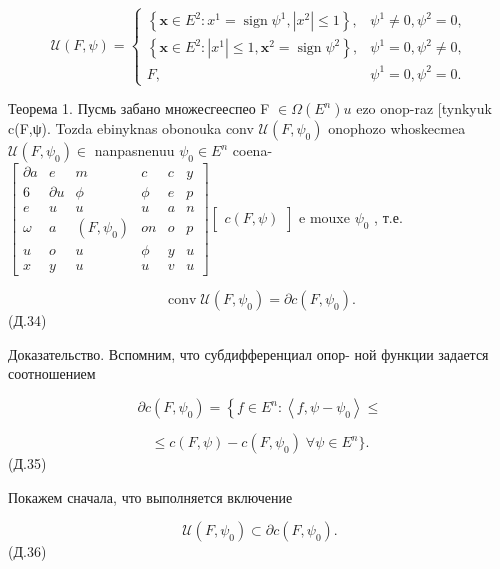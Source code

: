 \documentclass[8pt]{extarticle}
\begin{document}
\[
\mathcal{U}\left( {F,\psi }\right)  = \left\{  \begin{array}{ll} \left\{  {\mathbf{x} \in  {E}^{2} : {x}^{1} = \operatorname{sign}{\psi }^{1},\left| {x}^{2}\right|  \leq  1}\right\}  , & {\psi }^{1} \neq  0,{\psi }^{2} = 0, \\  \left\{  {\mathbf{x} \in  {E}^{2} : \left| {x}^{1}\right|  \leq  1,{\mathbf{x}}^{2} = \operatorname{sign}{\psi }^{2}}\right\}  , & {\psi }^{1} = 0,{\psi }^{2} \neq  0, \\  F, & {\psi }^{1} = 0,{\psi }^{2} = 0. \end{array}\right.
\]

\iffalse

Теорема 1. Пусмь забано множесгееспео F \(\in  \Omega \left( {E}^{n}\right) u\) ezo onop-raz [tynkyuk c(F,ψ). Tozda ebinyknas obonouka conv \(\mathcal{U}\left( {F,{\psi }_{0}}\right)\) onophozo whoskecmea \(\mathcal{U}\left( {F,{\psi }_{0}}\right)  \in\) nanpasnenuu \({\psi }_{0} \in  {E}^{n}\) coena- \(\left\lbrack  \begin{array}{cccccc} \partial a & e & m & c & c & y \\  6 & \partial u & \phi & \phi & e & p \\  e & u & u & u & a & n \\  \omega & a & \left( {F,{\psi }_{0}}\right) & {on} & o & p \\  u & o & u & \phi & y & u \\  x & y & u & u & v & u \end{array}\right\rbrack  \left\lbrack  \begin{array}{c} c\left( {F,\psi }\right) \end{array}\right\rbrack\) e mouxe \({\psi }_{0}\) , т.е.

\[
\operatorname{conv}\mathcal{U}\left( {F,{\psi }_{0}}\right)  = \partial c\left( {F,{\psi }_{0}}\right) .
\]
 (Д.34)

Доказательство. Вспомним, что субдифференциал опор- ной функции задается соотношением

\[
\partial c\left( {F,{\psi }_{0}}\right)  = \left\{  {f \in  {E}^{n} : \left\langle  {f,\psi  - {\psi }_{0}}\right\rangle   \leq  }\right.
\]

\[
\leq  c\left( {F,\psi }\right)  - c\left( {F,{\psi }_{0}}\right) \;\forall \psi  \in  {E}^{n}\} .
\]
 (Д.35)

Покажем сначала, что выполняется включение

\[
\mathcal{U}\left( {F,{\psi }_{0}}\right)  \subset  \partial c\left( {F,{\psi }_{0}}\right) .
\]
 (Д.36)
\end{document}
